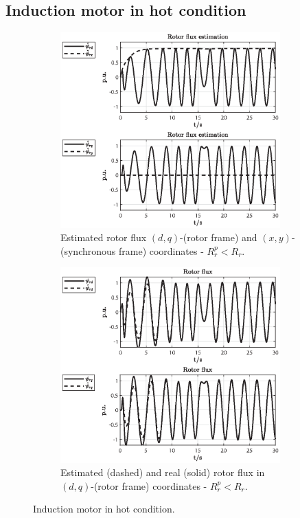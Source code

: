 \documentclass[11pt,a4paper,oneside]{book}
\numberwithin{equation}{section}
\theoremstyle{it}
\theoremstyle{definition}
\begin{document}
\subsection{Induction motor in hot condition}
\begin{figure}[H]
	\centering
	\begin{subfigure}{0.5\textwidth}
	\centering
	\includegraphics[width = 240pt, keepaspectratio]{figures/sim_results/hot_condition/rotor_flux_est_1.eps}
	\captionsetup{width=0.65\textwidth, font=footnotesize}	
	\caption{Estimated rotor flux $(d,q)$-(rotor frame) and $(x,y)$-(synchronous frame) coordinates - $R_r^p < R_r$.}
	\label{fig_sim_res_13}
	\end{subfigure}%
	\begin{subfigure}{0.5\textwidth}
	\centering
	\includegraphics[width = 240pt, keepaspectratio]{figures/sim_results/hot_condition/rotor_flux_est_2.eps}
	\captionsetup{width=0.65\textwidth, font=footnotesize}	
	\caption{Estimated (dashed) and real (solid) rotor flux in $(d,q)$-(rotor frame) coordinates - $R_r^p < R_r$.}
	\label{fig_sim_res_14}
	\end{subfigure}		
	\captionsetup{width=0.5\textwidth, font=small}		
	\caption{Induction motor in hot condition.}
	\label{}
\end{figure}
\end{document}
